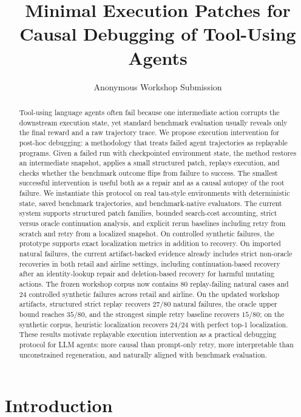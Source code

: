 \documentclass[11pt]{article}
\title{Minimal Execution Patches for Causal Debugging of Tool-Using Agents}
\author{Anonymous Workshop Submission}
\begin{document}
\maketitle

\begin{abstract}
Tool-using language agents often fail because one intermediate action corrupts
the downstream execution state, yet standard benchmark evaluation usually
reveals only the final reward and a raw trajectory trace. We propose execution
intervention for post-hoc debugging: a methodology that treats failed agent
trajectories as replayable programs. Given a failed run with checkpointed
environment state, the method restores an intermediate snapshot, applies a
small structured patch, replays execution, and checks whether the benchmark
outcome flips from failure to success. The smallest successful intervention is
useful both as a repair and as a causal autopsy of the root failure. We
instantiate this protocol on real tau-style environments with deterministic
state, saved benchmark trajectories, and benchmark-native evaluators. The
current system supports structured patch families, bounded search-cost
accounting, strict versus oracle continuation analysis, and explicit rerun
baselines including retry from scratch and retry from a localized snapshot. On
controlled synthetic failures, the prototype supports exact localization
metrics in addition to recovery. On imported natural failures, the current
artifact-backed evidence already includes strict non-oracle recoveries in both
retail and airline settings, including continuation-based recovery after an
identity-lookup repair and deletion-based recovery for harmful mutating
actions. The frozen workshop corpus now contains $80$ replay-failing natural
cases and $24$ controlled synthetic failures across retail and airline. On the
updated workshop artifacts, structured strict replay recovers $27/80$ natural
failures, the oracle upper bound reaches $35/80$, and the strongest simple retry
baseline recovers $15/80$; on the synthetic corpus, heuristic localization
recovers $24/24$ with perfect top-1 localization. These results motivate
replayable execution intervention as a practical debugging protocol for LLM
agents: more causal than prompt-only retry, more interpretable than
unconstrained regeneration, and naturally aligned with benchmark evaluation.
\end{abstract}

\section{Introduction}
\end{document}
